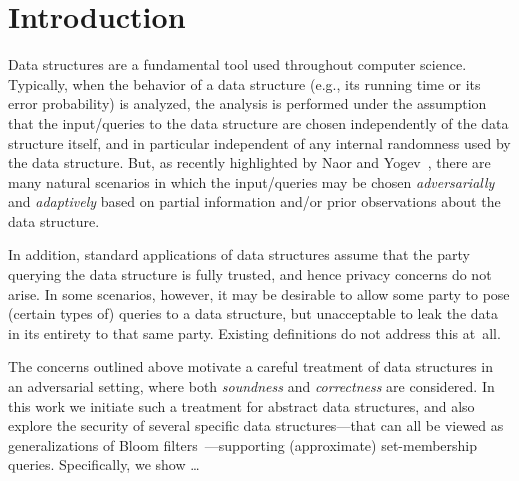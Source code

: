 \section{Introduction}
\label{sec:intro}

Data structures are a fundamental tool used throughout computer
science. Typically, when the behavior of a data structure (e.g., its
running time or its error probability) is analyzed, the analysis is
performed under the assumption that the input/queries to the data
structure are chosen independently of the data structure itself, and
in particular independent of any internal randomness used by the
data structure. But, as recently highlighted by Naor and
Yogev~\cite{naor2015bloom}, there are many natural scenarios in
which the input/queries may be chosen \emph{adversarially} and
\emph{adaptively} based on partial information and/or prior
observations about the data structure.

In addition, standard applications of data structures assume that
the party querying the data structure is fully trusted, and hence
privacy concerns do not arise. In some scenarios, however, it may be
desirable to allow some party to pose (certain types of) queries to
a data structure, but unacceptable to leak the data in its entirety
to that same party. Existing definitions do not address this at~all.

The concerns outlined above motivate a careful treatment of data
structures in an adversarial setting, where both \emph{soundness}
 and \emph{correctness} are considered. In this work we
initiate such a treatment for abstract data structures, and also
explore the security of several specific data structures---that can
all be viewed as generalizations of Bloom
filters~\cite{bloom1970space}---supporting (approximate)
set-membership queries. Specifically, we show \ldots

